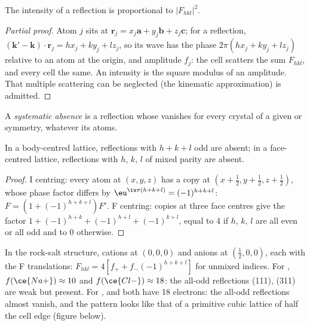 \begin{proposition}[Intensity]\label{prop:b3:x-ray-diffraction:intensity}
The intensity of a reflection is proportional to $|F_{hkl}|^2$.
\end{proposition}

\begin{proof}[Partial proof]
Atom $j$ sits at $\mathbf r_j = x_j\mathbf a + y_j\mathbf b + z_j\mathbf c$; for a reflection,
$(\mathbf k' - \mathbf k)\cdot\mathbf r_j = hx_j + ky_j + lz_j$, so its wave has the phase
$2\pi(hx_j + ky_j + lz_j)$ relative to an atom at the origin, and amplitude $f_j$:
the cell scatters the sum $F_{hkl}$, and every cell the same. An intensity is the
square modulus of an amplitude. That multiple scattering can be neglected
(the kinematic approximation) is admitted.
\end{proof}

\begin{definition}\label{def:b3:x-ray-diffraction:absence}
A \emph{systematic absence} is a reflection whose
 vanishes for every crystal of a given  or
symmetry, whatever its atoms.
\end{definition}

\begin{proposition}\label{prop:b3:x-ray-diffraction:absences}
In a body-centred lattice, reflections with $h + k + l$ odd are absent; in a
face-centred lattice, reflections with $h$, $k$, $l$ of mixed parity are absent.
\end{proposition}

\begin{proof}
I centring: every atom at $(x,y,z)$ has a copy at $(x + \frac12, y + \frac12, z + \frac12)$,
whose phase factor differs by $\eu^{\iu\pi(h+k+l)} = (-1)^{h+k+l}$: $F = (1 +
(-1)^{h+k+l})F'$. F centring: copies at three face centres give the factor $1 +
(-1)^{h+k} + (-1)^{h+l} + (-1)^{k+l}$, equal to 4 if $h$, $k$, $l$ are all even or all odd
and to 0 otherwise.
\end{proof}

\begin{example}\label{ex:b3:x-ray-diffraction:nacl-kcl}
In the rock-salt structure, cations at $(0,0,0)$ and anions at $(\frac12,0,0)$, each
with the F translations: $F_{hkl} = 4[f_+ + f_-(-1)^{h+k+l}]$ for unmixed indices.
For , $f(\ce{Na+}) \approx 10$ and $f(\ce{Cl-}) \approx 18$: the all-odd reflections
(111), (311) are weak but present. For ,  and  both have 18
electrons: the all-odd reflections almost vanish, and the pattern looks like
that of a primitive cubic lattice of half the cell edge (figure below).
\end{example}

